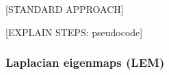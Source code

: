 \documentclass[journal, a4paper]{IEEEtran}
\begin{document}
%
%
% 
%


[STANDARD APPROACH]

[EXPLAIN STEPS: pseudocode]






\subsubsection{Laplacian eigenmaps (LEM)}\\
\end{document}
